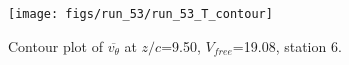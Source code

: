 \begin{figure}[H]
\centering
\texttt{[image: figs/run\_53/run\_53\_T\_contour]}
\caption{Contour plot of $\overline{v_{\theta}}$ at $z/c$=9.50, $V_{free}$=19.08, station 6.}
\label{fig:run_53_T_contour}
\end{figure}


